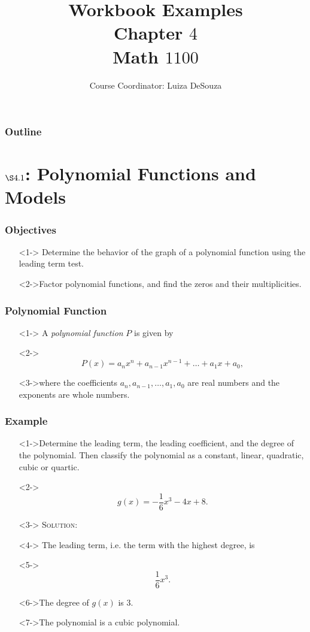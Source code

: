 \documentclass{beamer}
\title{Workbook Examples \\ Chapter $4$ \\ Math $1100$}
\author{Course Coordinator: Luiza DeSouza}
\date{\datefmt{\year}{\month}{\day}}
\begin{document}
\begin{frame}
	\titlepage
\end{frame}

\begin{frame}
	\frametitle{Outline}
	\tableofcontents
\end{frame}

\section{$\S 4.1$: Polynomial Functions and Models}

\begin{frame}
	\frametitle{Objectives}
	\begin{enumerate}
		\item[]<1-> Determine the behavior of the graph of a polynomial function using the leading term test.
		\item[]<2->Factor polynomial functions, and find the zeros and their multiplicities.
	\end{enumerate}
\end{frame}

\begin{frame}
	\frametitle{Polynomial Function}
	\begin{enumerate}
		\item[]<1-> A \emph{polynomial function} $P$ is given by
		\item[]<2->
		\[
			P(x)=a_{n}x^{n}+a_{n-1}x^{n-1}+\dots+a_{1}x+a_{0},
		\]
		\item[]<3->where the coefficients $a_{n}, a_{n-1}, \dots, a_{1}, a_{0}$ are real numbers and the exponents are whole numbers.
	\end{enumerate}
\end{frame}

\begin{frame}
	\frametitle{Example}
	\begin{enumerate}
		\item[]<1->Determine the leading term, the leading coefficient, and the degree of the polynomial.  Then classify the polynomial as a constant, linear, quadratic, cubic or quartic.
		\item[]<2->
		\[
			g(x)=-\frac{1}{6}x^{3}-4x+8.
		\]
		\item[]<3-> \textsc{Solution:}
		\item[]<4-> The leading term, i.e. the term with the highest degree, is
		\item[]<5-> \[ \frac{1}{6}x^{3}. \]
		\item[]<6->The degree of $g(x)$ is $3$.
		\item[]<7->The polynomial is a cubic polynomial.
	\end{enumerate}
\end{frame}
\end{document}
